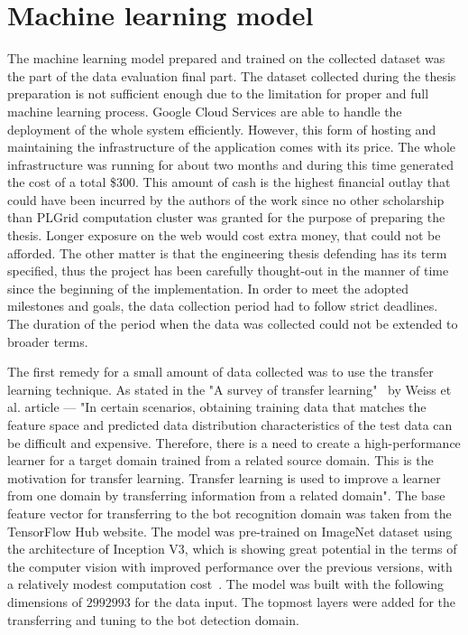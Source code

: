 \section{Machine learning model}\label{sec:machine-learning-model}
The machine learning model prepared and trained on the collected dataset was the part of the data evaluation final part.
The dataset collected during the thesis preparation is not sufficient enough due to the limitation for proper and full machine learning process.
Google Cloud Services are able to handle the deployment of the whole system efficiently.
However, this form of hosting and maintaining the infrastructure of the application comes with its price.
The whole infrastructure was running for about two months and during this time generated the cost of a total \$300.
This amount of cash is the highest financial outlay that could have been incurred by the authors of the work since no other scholarship than PLGrid computation cluster was granted for the purpose of preparing the thesis.
Longer exposure on the web would cost extra money, that could not be afforded.
The other matter is that the engineering thesis defending has its term specified, thus the project has been carefully thought-out in the manner of time since the beginning of the implementation.
In order to meet the adopted milestones and goals, the data collection period had to follow strict deadlines.
The duration of the period when the data was collected could not be extended to broader terms.

The first remedy for a small amount of data collected was to use the transfer learning technique.
As stated in the "A survey of transfer learning"~\cite{transfer-learning-def} by Weiss et al. article --- "In certain scenarios, obtaining training data that matches the feature space and predicted data distribution characteristics of the test data can be difficult and expensive.
Therefore, there is a need to create a high-performance learner for a target domain trained from a related source domain.
This is the motivation for transfer learning.
Transfer learning is used to improve a learner from one domain by transferring information from a related domain".
The base feature vector for transferring to the bot recognition domain was taken from the TensorFlow Hub website.
The model was pre-trained on ImageNet dataset using the architecture of Inception V3, which is showing great potential in the terms of the computer vision with improved performance over the previous versions, with a relatively modest computation cost~\cite{inception-v3}.
The model was built with the following dimensions of $299$\texttimes$299$\texttimes$3$ for the data input.
The topmost layers were added for the transferring and tuning to the bot detection domain.

